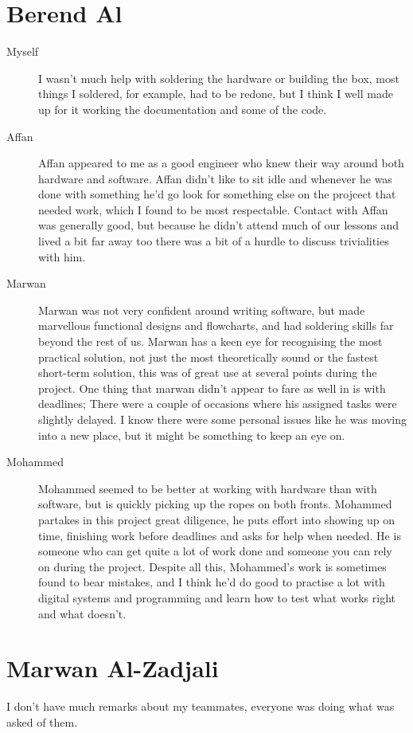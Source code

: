 \section{Berend Al}
\begin{description}
\item[Myself]
I wasn't much help with soldering the hardware or building the box, most things I soldered, for example, had to be redone, but I think I well made up for it working the documentation and some of the code.

\item[Affan]
Affan appeared to me as a good engineer who knew their way around both hardware and software.
Affan didn't like to sit idle and whenever he was done with something he'd go look for something else on the projcect that needed work, which I found to be most respectable.
Contact with Affan was generally good, but because he didn't attend much of our lessons and lived a bit far away too there was a bit of a hurdle to discuss trivialities with him.

\item[Marwan]
Marwan was not very confident around writing software, but made marvellous functional designs and flowcharts, and had soldering skills far beyond the rest of us. 
Marwan has a keen eye for recognising the most practical solution, not just the most theoretically sound or the fastest short-term solution, this was of great use at several points during the project.
One thing that marwan didn't appear to fare as well in is with deadlines; There were a couple of occasions where his assigned tasks were slightly delayed.
I know there were some personal issues like he was moving into a new place, but it might be something to keep an eye on.

\item[Mohammed]
Mohammed seemed to be better at working with hardware than with software, but is quickly picking up the ropes on both fronts.
Mohammed partakes in this project great diligence, he puts effort into showing up on time, finishing work before deadlines and asks for help when needed.
He is someone who can get quite a lot of work done and someone you can rely on during the project.
Despite all this, Mohammed's work is sometimes found to bear mistakes, and I think he'd do good to practise a lot with digital systems and programming and learn how to test what works right and what doesn't.
\end{description}

\section{Marwan Al-Zadjali}
I don't have much remarks about my teammates, everyone was doing what was asked of them.

